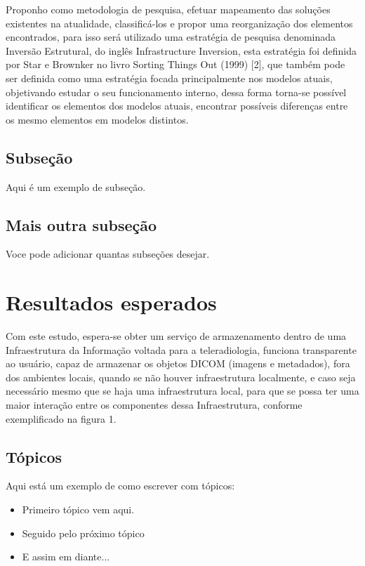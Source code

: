 \documentclass[conference]{IEEEtran}
\begin{document}
Proponho como metodologia de pesquisa, efetuar mapeamento das soluções existentes na atualidade, classificá-los e propor uma reorganização dos elementos encontrados, para isso  será utilizado uma estratégia de pesquisa denominada Inversão Estrutural, do inglês Infrastructure Inversion, esta estratégia foi definida por Star e Brownker no livro Sorting Things Out (1999) [2], que também pode ser definida como uma estratégia focada principalmente nos modelos atuais, objetivando estudar o seu funcionamento interno, dessa forma torna-se possível identificar os elementos dos modelos atuais, encontrar possíveis diferenças entre os mesmo elementos em modelos distintos.

\subsection{Subseção}

Aqui é um exemplo de subseção.

\subsection{Mais outra subseção}

Voce pode adicionar quantas subseções desejar.

\section{Resultados esperados}

Com este estudo, espera-se obter um serviço de armazenamento dentro de uma Infraestrutura da Informação voltada para a teleradiologia, funciona transparente ao usuário, capaz de armazenar os objetos DICOM (imagens e metadados), fora dos ambientes locais, quando se não houver infraestrutura localmente, e caso seja necessário mesmo que se haja uma infraestrutura local, para que se possa ter uma maior interação entre os componentes dessa Infraestrutura, conforme exemplificado na figura 1.


\subsection{Tópicos}

Aqui está um exemplo de como escrever com tópicos:

\begin{itemize}

\item Primeiro tópico vem aqui.
\item Seguido pelo próximo tópico
\item E assim em diante...

\end{itemize}
\end{document}

